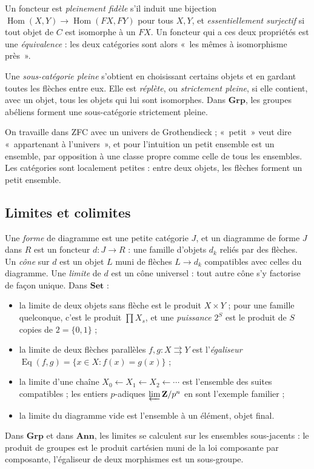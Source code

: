 \documentclass[11pt,a4paper]{amsart}
\theoremstyle{definition}
\theoremstyle{plain}
\theoremstyle{remark}
\newcommand{\Set}{\mathbf{Set}}
\newcommand{\Grp}{\mathbf{Grp}}
\newcommand{\Ann}{\mathbf{Ann}}
\newcommand{\Hom}{\operatorname{Hom}}
\newcommand{\Eq}{\operatorname{Eq}}
\begin{document}
Un foncteur est \emph{pleinement fidèle} s'il induit une bijection $\Hom(X,Y)\to\Hom(FX,FY)$ pour tous $X,Y$, et \emph{essentiellement surjectif} si tout objet de $C$ est isomorphe à un $FX$. Un foncteur qui a ces deux propriétés est une \emph{équivalence} : les deux catégories sont alors «~les mêmes à isomorphisme près~».

Une \emph{sous-catégorie pleine} s'obtient en choisissant certains objets et en gardant toutes les flèches entre eux. Elle est \emph{réplète}, ou \emph{strictement pleine}, si elle contient, avec un objet, tous les objets qui lui sont isomorphes. Dans $\Grp$, les groupes abéliens forment une sous-catégorie strictement pleine.

On travaille dans ZFC avec un univers de Grothendieck ; «~petit~» veut dire «~appartenant à l'univers~», et pour l'intuition un petit ensemble est un ensemble, par opposition à une classe propre comme celle de tous les ensembles. Les catégories sont localement petites : entre deux objets, les flèches forment un petit ensemble.

\subsection{Limites et colimites}

Une \emph{forme} de diagramme est une petite catégorie $J$, et un diagramme de forme $J$ dans $R$ est un foncteur $d\colon J\to R$ : une famille d'objets $d_k$ reliés par des flèches. Un \emph{cône} sur $d$ est un objet $L$ muni de flèches $L\to d_k$ compatibles avec celles du diagramme. Une \emph{limite} de $d$ est un cône universel : tout autre cône s'y factorise de façon unique. Dans $\Set$ :
\begin{itemize}
\item la limite de deux objets sans flèche est le produit $X\times Y$ ; pour une famille quelconque, c'est le produit $\prod X_s$, et une \emph{puissance} $2^S$ est le produit de $S$ copies de $2=\{0,1\}$ ;
\item la limite de deux flèches parallèles $f,g\colon X\rightrightarrows Y$ est l'\emph{égaliseur} $\Eq(f,g)=\{x\in X: f(x)=g(x)\}$ ;
\item la limite d'une chaîne $X_0\leftarrow X_1\leftarrow X_2\leftarrow\cdots$ est l'ensemble des suites compatibles ; les entiers $p$-adiques $\varprojlim\mathbf Z/p^n$ en sont l'exemple familier ;
\item la limite du diagramme vide est l'ensemble à un élément, objet final.
\end{itemize}
Dans $\Grp$ et dans $\Ann$, les limites se calculent sur les ensembles sous-jacents : le produit de groupes est le produit cartésien muni de la loi composante par composante, l'égaliseur de deux morphismes est un sous-groupe.
\end{document}

